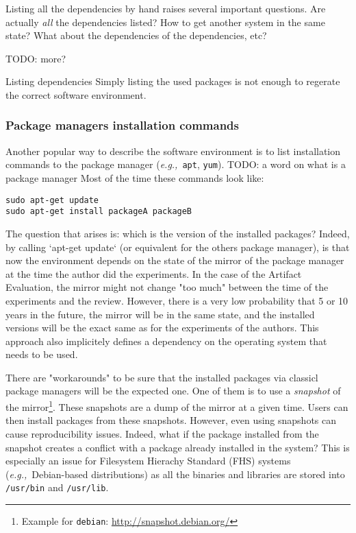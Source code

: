 \documentclass[sigconf]{acmart}
\newcommand{\eg}{\emph{e.g.,}}
\newcommand{\aeval}{Artifact Evaluation}
\newcommand{\todo}[1]{{\color{red}TODO: #1}}
\begin{document}
Listing all the dependencies by hand raises several important questions.
Are actually \emph{all} the dependencies listed?
How to get another system in the same state?
What about the dependencies of the dependencies, etc?

\todo{more?}

\begin{lesson}{Listing dependencies}{}
  Simply listing the used packages is not enough to regerate the correct software environment.
\end{lesson}

\subsubsection{Package managers installation commands}

Another popular way to describe the software environment is to list installation commands to the package manager (\eg\ \texttt{apt}, \texttt{yum}).
\todo{a word on what is a package manager}
Most of the time these commands look like:

\begin{verbatim}
sudo apt-get update
sudo apt-get install packageA packageB
\end{verbatim}

The question that arises is: which is the version of the installed packages?
Indeed, by calling `apt-get update` (or equivalent for the others package manager), is that now the environment depends on the state of the mirror of the package manager at the time the author did the experiments.
In the case of the \aeval, the mirror might not change "too much" between the time of the experiments and the review.
However, there is a very low probability that 5 or 10 years in the future, the mirror will be in the same state, and the installed versions will be the exact same as for the experiments of the authors.
This approach also implicitely defines a dependency on the operating system that needs to be used.

There are "workarounds" to be sure that the installed packages via classicl package managers will be the expected one. 
One of them is to use a \emph{snapshot} of the mirror\footnote{Example for \texttt{debian}: \url{http://snapshot.debian.org/}}.
These snapshots are a dump of the mirror at a given time.
Users can then install packages from these snapshots.
However, even using snapshots can cause reproducibility issues.
Indeed, what if the package installed from the snapshot creates a conflict with a package already installed in the system?
This is especially an issue for Filesystem Hierachy Standard (FHS) systems (\eg\ Debian-based distributions) as all the binaries and libraries are stored into \texttt{/usr/bin} and \texttt{/usr/lib}.
\end{document}
